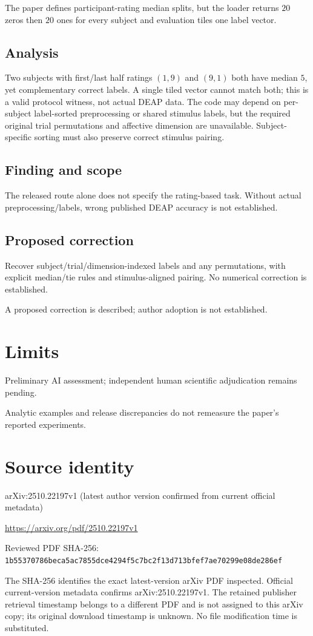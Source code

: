 \documentclass[11pt]{article}
\begin{document}
The paper defines participant-rating median splits, but the loader returns \(20\) zeros then \(20\) ones for every subject and evaluation tiles one label vector.

\subsection*{Analysis}

Two subjects with first/last half ratings \((1,9)\) and \((9,1)\) both have median \(5\), yet complementary correct labels. A single tiled vector cannot match both; this is a valid protocol witness, not actual DEAP data. The code may depend on per-subject label-sorted preprocessing or shared stimulus labels, but the required original trial permutations and affective dimension are unavailable. Subject-specific sorting must also preserve correct stimulus pairing.

\subsection*{Finding and scope}

The released route alone does not specify the rating-based task. Without actual preprocessing/labels, wrong published DEAP accuracy is not established.

\subsection*{Proposed correction}

Recover subject/trial/dimension-indexed labels and any permutations, with explicit median/tie rules and stimulus-aligned pairing. No numerical correction is established.

A proposed correction is described; author adoption is not established.

\section*{Limits}

Preliminary AI assessment; independent human scientific adjudication remains pending.\par

Analytic examples and release discrepancies do not remeasure the paper’s reported experiments.\par

\section*{Source identity}

arXiv:2510.22197v1 (latest author version confirmed from current official metadata)

\url{https://arxiv.org/pdf/2510.22197v1}

Reviewed PDF SHA-256: \nolinkurl{1b55370786beca5ac7855dce4294f5c7bc2f13d713bfef7ae70299e08de286ef}

The SHA-256 identifies the exact latest-version arXiv PDF inspected. Official current-version metadata confirms arXiv:2510.22197v1. The retained publisher retrieval timestamp belongs to a different PDF and is not assigned to this arXiv copy; its original download timestamp is unknown. No file modification time is substituted.
\end{document}
